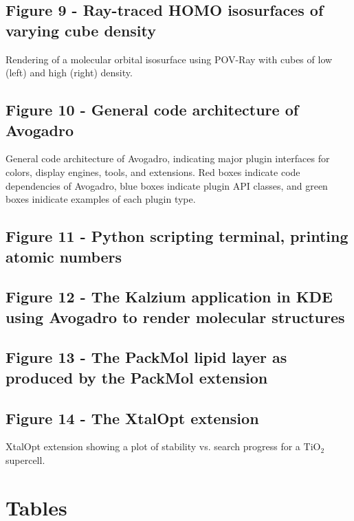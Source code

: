 \documentclass[10pt]{bmc_article}
\newenvironment{bmcformat}{\begin{raggedright}
  \baselineskip20pt\sloppy\setboolean{publ}{false}}{\end{raggedright}
  \baselineskip20pt\sloppy}
\begin{document}
\begin{bmcformat}
  \subsection*{Figure 9 - Ray-traced HOMO isosurfaces of varying cube density}
    Rendering of a molecular orbital isosurface using POV-Ray with cubes
    of low (left) and high (right) density.

  \subsection*{Figure 10 - General code architecture of Avogadro}
    General code architecture of Avogadro, indicating major
    plugin interfaces for colors, display engines, tools, and
    extensions. Red boxes indicate code dependencies of Avogadro, blue
    boxes indicate plugin API classes, and green boxes inidicate examples of
    each plugin type.

  \subsection*{Figure 11 - Python scripting terminal, printing atomic numbers}

  \subsection*{Figure 12 - The Kalzium application in KDE using Avogadro to render molecular structures}

  \subsection*{Figure 13 - The PackMol lipid layer as produced by the PackMol extension}

  \subsection*{Figure 14 - The XtalOpt extension}
    XtalOpt extension showing a plot of stability vs. search progress
    for a $\mathrm{TiO_2}$ supercell.



\section*{Tables}

\end{bmcformat}
\end{document}
